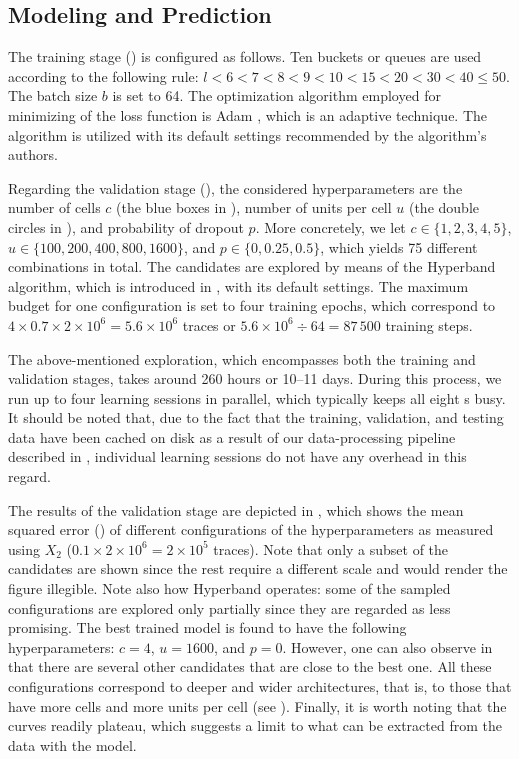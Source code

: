 \subsection{Modeling and Prediction}
The training stage () is configured as follows. Ten buckets or
queues are used according to the following rule: $l < 6 < 7 < 8 < 9 < 10 < 15 <
20 < 30 < 40 \leq 50$. The batch size $b$ is set to 64. The optimization
algorithm employed for minimizing of the loss function is Adam
\cite{kingma2014}, which is an adaptive technique. The algorithm is utilized
with its default settings recommended by the algorithm's authors.

Regarding the validation stage (), the considered
hyperparameters are the number of cells $c$ (the blue boxes in ),
number of units per cell $u$ (the double circles in ), and
probability of dropout $p$. More concretely, we let $c \in \{1, 2, 3, 4, 5\}$,
$u \in \{100, 200, 400, 800, 1600\}$, and $p \in \{0, 0.25, 0.5\}$, which yields
75 different combinations in total. The candidates are explored by means of the
Hyperband algorithm, which is introduced in , with its default
settings. The maximum budget for one configuration is set to four training
epochs, which correspond to $4 \times 0.7 \times 2 \times 10^6 = 5.6 \times
10^6$ traces or $5.6 \times 10^6 \div 64 = 87\,500$ training steps.

The above-mentioned exploration, which encompasses both the training and
validation stages, takes around 260 hours or 10--11 days. During this process,
we run up to four learning sessions in parallel, which typically keeps all eight
s busy. It should be noted that, due to the fact that the training,
validation, and testing data have been cached on disk as a result of our
data-processing pipeline described in , individual learning sessions
do not have any overhead in this regard.


The results of the validation stage are depicted in , which
shows the mean squared error () of different configurations of the
hyperparameters as measured using $X_2$ ($0.1 \times 2 \times 10^6 = 2 \times
10^5$ traces). Note that only a subset of the candidates are shown since the
rest require a different scale and would render the figure illegible. Note also
how Hyperband operates: some of the sampled configurations are explored only
partially since they are regarded as less promising. The best trained model is
found to have the following hyperparameters: $c = 4$, $u = 1600$, and $p = 0$.
However, one can also observe in  that there are several other
candidates that are close to the best one. All these configurations correspond
to deeper and wider architectures, that is, to those that have more cells and
more units per cell (see ). Finally, it is worth noting that the
curves readily plateau, which suggests a limit to what can be extracted from the
data with the model.

